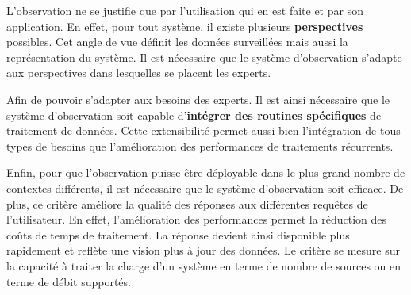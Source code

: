 L'observation ne se justifie que par l'utilisation qui en est faite et par son application. En effet, pour tout système, il existe plusieurs \textbf{perspectives} possibles. Cet angle de vue définit les données surveillées mais aussi la représentation du système. Il est nécessaire que le système d'observation s'adapte aux perspectives dans lesquelles se placent les experts.

Afin de pouvoir s'adapter aux besoins des experts. Il est ainsi nécessaire que le système d'observation soit capable d'\textbf{intégrer des routines spécifiques} de traitement de données. Cette extensibilité permet aussi bien l'intégration de tous types de besoins que l'amélioration des performances de traitements récurrents.

Enfin, pour que l'observation puisse être déployable dans le plus grand nombre de contextes différents, il est nécessaire que le système d'observation soit efficace. De plus, ce critère améliore la qualité des réponses aux différentes requêtes de l'utilisateur. En effet, l'amélioration des performances permet la réduction des coûts de temps de traitement. La réponse devient ainsi disponible plus rapidement et reflète une vision plus à jour des données. Le critère se mesure sur la capacité à traiter la charge d'un système en terme de nombre de sources ou en terme de débit supportés.

